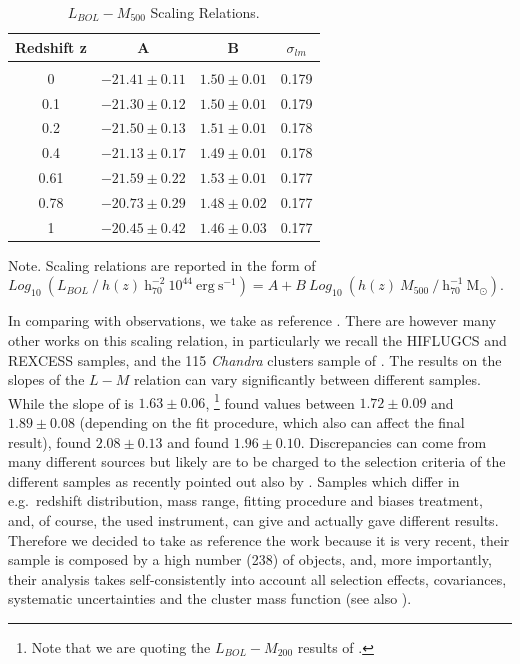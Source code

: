 \documentclass[traditabstract]{aa}
\newcommand{\rmn}{\mathrm}
\begin{document}
\begin{table}[hbt!]
\begin{center}
\caption{$L_{BOL}-M_{500}$ Scaling Relations.}
\medskip
\begin{tabular}{cccc}
\hline
\phantom{\Big|}
Redshift z & A & B & $\sigma_{lm}$ \\
\hline \\[-0.5em]
 0      & $-21.41\pm0.11$ & $1.50\pm0.01$ & 0.179\\
 0.1   & $-21.30\pm0.12$ & $1.50\pm0.01$ & 0.179\\
 0.2   & $-21.50\pm0.13$ & $1.51\pm0.01$ & 0.178\\ 
 0.4   & $-21.13\pm0.17$ & $1.49\pm0.01$ & 0.178\\ 
 0.61 & $-21.59\pm0.22$ & $1.53\pm0.01$ & 0.177\\ 
 0.78 & $-20.73\pm0.29$ & $1.48\pm0.02$ & 0.177\\ 
 1      & $-20.45\pm0.42$ & $1.46\pm0.03$ & 0.177\\[0.5em]
\hline
\end{tabular}
\label{tab:LMfits}
\end{center}
\footnotesize{Note. Scaling relations are reported in the form of $Log_{10}~(L_{BOL}~/~h(z)~\rmn{h}_{70}^{-2}~10^{44}~\rmn{erg~s}^{-1})=A+B~Log_{10}~(h(z)~M_{500}~/~\rmn{h}_{70}^{-1}~\rmn{M_{\odot}})$. 
}
\end{table}

In comparing with observations, we take as reference \cite{2010MNRAS.406.1773M}. There are however many other works on this scaling relation, in particularly we recall the HIFLUGCS \citep{2002ApJ...567..716R} and REXCESS \citep{2009A&A...498..361P} samples, and the 115 \emph{Chandra} clusters sample of \cite{2007ApJ...668..772M}. The results on the slopes of the $L-M$ relation can vary significantly between different samples. While the slope of \cite{2010MNRAS.406.1773M} is $1.63\pm0.06$, \cite{2002ApJ...567..716R}\footnote[7]{Note that we are quoting the $L_{BOL}-M_{200}$ results of \cite{2002ApJ...567..716R}.} found values between $1.72\pm0.09$ and $1.89\pm0.08$ (depending on the fit procedure, which also can affect the final result), \cite{2009A&A...498..361P} found $2.08\pm0.13$ and \cite{2007ApJ...668..772M} found $1.96\pm0.10$. Discrepancies can come from many different sources but likely are to be charged to the selection criteria of the different samples as recently pointed out also by \cite{2011arXiv1109.3708R}. Samples which differ in e.g.~redshift distribution, mass range, fitting procedure and biases treatment, and, of course, the used instrument, can give and actually gave different results. Therefore we decided to take as reference the \cite{2010MNRAS.406.1773M} work because it is very recent, their sample is composed by a high number (238) of objects, and, more importantly, their analysis takes self-consistently into account all selection effects, covariances, systematic uncertainties and the cluster mass function (see also \citealp{2010MNRAS.406.1759M}).
\end{document}
